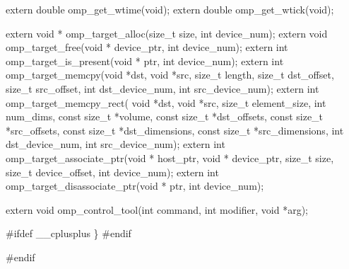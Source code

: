 {\begin{codepar}
extern double omp\_get\_wtime(void);
extern double omp\_get\_wtick(void);

extern void * omp\_target\_alloc(size\_t size, int device\_num);
extern void omp\_target\_free(void * device\_ptr, int device\_num);
extern int omp\_target\_is\_present(void * ptr, int device\_num);
extern int omp\_target\_memcpy(void *dst, void *src, size\_t length,
                              size\_t dst\_offset, size\_t src\_offset,
                              int dst\_device\_num, int src\_device\_num);
extern int omp\_target\_memcpy\_rect(
    void *dst, void *src,
    size\_t element\_size,
    int num\_dims,
    const size\_t *volume,
    const size\_t *dst\_offsets,
    const size\_t *src\_offsets,
    const size\_t *dst\_dimensions,
    const size\_t *src\_dimensions,
    int dst\_device\_num, int src\_device\_num);
extern int omp\_target\_associate\_ptr(void * host\_ptr,
                                       void * device\_ptr,
                                       size\_t size,
                                       size\_t device\_offset,
                                       int device\_num);
extern int omp\_target\_disassociate\_ptr(void * ptr,
                                          int device\_num);

extern void omp\_control\_tool(int command, int modifier, void *arg);

\#ifdef _\_cplusplus
\}
\#endif

\#endif
\end{codepar}} %





